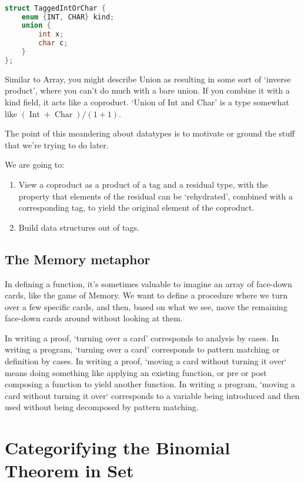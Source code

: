 \documentclass{proc-l}
\theoremstyle{definition}
\theoremstyle{remark}
\numberwithin{equation}{section}
\begin{document}
\begin{lstlisting}[language=C]

struct TaggedIntOrChar {
    enum {INT, CHAR} kind;
    union {
        int x;
        char c;
    }
};
\end{lstlisting}

Similar to Array, you might describe Union as resulting in some sort of `inverse product',
where you can't do much with a bare union. If you combine it with a kind field,
it acts like a coproduct. `Union of Int and Char' is a type somewhat 
like \((\operatorname{Int} + \operatorname{Char}) / (1 + 1)\).

The point of this meandering about datatypes is to motivate or ground the stuff that we're trying to do later.

We are going to:
\begin{enumerate}
\item View a coproduct as a product of a tag and a residual type, with the property that elements of the residual can be `rehydrated', combined with a corresponding tag, to yield the original element of the coproduct.
\item Build data structures out of tags.
\end{enumerate}

\subsection{The Memory metaphor}
In defining a function, it's sometimes valuable to imagine an array of face-down cards, like the game of Memory. We want to define a procedure where we turn over a few specific cards, and then, 
based on what we see, move the remaining face-down cards around without looking at them.

In writing a proof, `turning over a card' corresponds to analysis by cases. In writing a program, `turning over a card' corresponds to pattern matching or definition by cases. In writing a proof, `moving a card without turning it over` means doing something like applying an existing function, or pre or post composing a function to yield another function. In writing a program, `moving a card without turning it over` corresponds to a variable being introduced and then used without being decomposed by pattern matching. 


\section{Categorifying the Binomial Theorem in Set}
\end{document}
